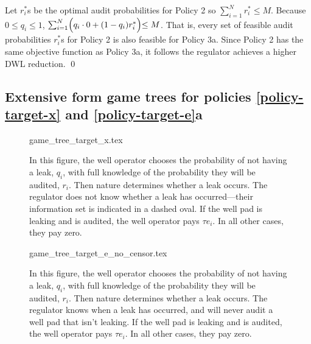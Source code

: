 \documentclass[12pt,oneside,letterpaper]{article}
\newlength{\premathenv}
\newlength{\postmathenv}
\theoremstyle{definition}
\renewenvironment{proof}{%
\vspace{\premathenv}%
\noindent{\textit{Proof:} }
}{%
\qed
\vspace{\postmathenv}%
}
\begin{document}
\begin{refsection}
\begin{proof}
Let \(r^*_i\)s be the optimal audit probabilities for Policy 2 so \(\sum^{N}_{i=1} r^*_i \leq M\).
Because \(0 \leq q_i \leq 1\), \(\sum^{N}_{i=1} \Bigl( q_i \cdot 0 + (1 - q_i) r^*_i \Bigl) \leq M\).
That is, every set of feasible audit probabilities \(r^*_i\)s for Policy 2 is also feasible for Policy 3a.
Since Policy 2 has the same objective function as Policy 3a, it follows the regulator achieves a higher \gls{DWL} reduction.
\end{proof}


\newpage

\subsection{Extensive form game trees for policies \ref{policy-target-x} and \ref{policy-target-e}a}



\begin{figure}[!pbth]
\vspace*{-1\baselineskip}%
{game_tree_target_x.tex} %

\begin{minipage}{1\textwidth}

\begin{justify}
{\small
In this figure, the well operator chooses the probability of not having a leak, \(q_i\), with full knowledge of the probability they will be audited, \(r_i\).
Then nature determines whether a leak occurs.
The regulator does not know whether a leak has occurred---their information set is indicated in a dashed oval.
If the well pad is leaking and is audited, the well operator pays \(\tau e_i\).
In all other cases, they pay zero.
}
\end{justify}
\end{minipage}
\end{figure}



\begin{figure}[!pbth] %
{game_tree_target_e_no_censor.tex}

\begin{minipage}{1\textwidth}

\begin{justify}
{\small
In this figure, the well operator chooses the probability of not having a leak, \(q_i\), with full knowledge of the probability they will be audited, \(r_i\).
Then nature determines whether a leak occurs.
The regulator knows when a leak has occurred, and will never audit a well pad that isn't leaking.
If the well pad is leaking and is audited, the well operator pays \(\tau e_i\).
In all other cases, they pay zero.
}
\end{justify}
\end{minipage}
\end{figure}


\end{refsection}
\end{document}

